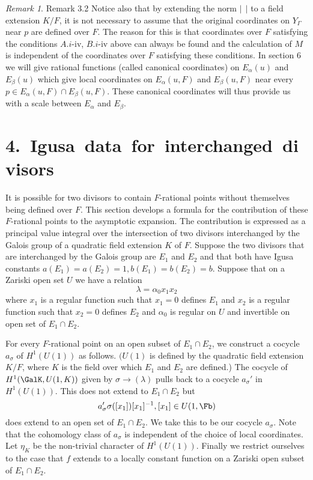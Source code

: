 \documentclass{memo-l}
\theoremstyle{definition}
\theoremstyle{remark}
\newtheorem{remark}[theorem]{Remark}
\numberwithin{section}{chapter}
\numberwithin{equation}{chapter}
\begin{document}
\begin{remark}{Remark 3.2} Notice also that by extending the norm $\vert\
\ 
\vert$ to a field extension $K/F$, it is not necessary to assume that the
original coordinates on $Y_{{\Gamma}}$ near $p$ are defined over $F$.  The
reason for this is that coordinates over $F$ satisfying the conditions
$A.i$-iv, $B.i$-iv above can always be found and the calculation of $M$ is
independent of the coordinates over $F$ satisfying these conditions.  In
section $6$ we will give rational functions (called canonical coordinates)
on $E_{{\alpha}}(u)$ and $E_{{\beta}}(u)$ which give local coordinates on
$E_{{\alpha}}(u,F)$ and $E_{\beta}(u,F)$ near every $p \in
E_{{\alpha}}(u,F) \cap E_{{\beta}}(u,F)$.  These canonical coordinates
will thus provide us with a scale between $E_{{\alpha}}$ and $E_{{\beta}}$.
\end{remark}

\section{4.\ Igusa\ data\ for\ interchanged\ divisors}

   It is possible for two divisors to contain $F$-rational points without
themselves being defined over $F$.  This section develops a formula for the
contribution of these $F$-rational points to the asymptotic expansion.  The
contribution is expressed as a principal value integral over the
intersection of two divisors interchanged by the Galois group of a
quadratic field extension $K$ of $F$.  Suppose the two divisors that are
interchanged by the Galois group are $E_{1}$ and $E_{2}$ and that both have
Igusa constants $a(E_{1}) = a(E_{2}) = 1, b(E_{1}) = b(E_{2}) = b$.
Suppose that on a Zariski open set $U$ we have a relation
$$
{\lambda} = {\alpha}_{0}x_{1}x_{2}
$$
where $x_{1}$ is a regular function such that $x_{1} = 0$ defines $E_{1}$
and $x_{2}$ is a regular function such that $x_{2} = 0$ defines $E_{2}$ and
${\alpha}_{0}$ is regular on $U$ and invertible on open set of $E_{1}
\cap E_{2}$.
 

   For every $F$-rational point on an open subset of $E_{1} \cap E_{2}$, we
construct a cocycle $a_{{\sigma}}$ of $H^{1}(U(1))$ as follows.  $(U(1)$ is
defined by the quadratic field extension $K/F$, where $K$ is the field over
which $E_{1}$ and $E_{2}$ are defined.) The cocycle of
$H^{1}(\GalK,U(1,K))$ given by ${\sigma} {\to} ({\lambda})$ pulls back
to a cocycle $a_{{\sigma}}'$ in $H^{1}(U(1))$.  This does not extend to
$E_{1} \cap E_{2}$ but
$$
a_{{\sigma}}'{\sigma}([x_{1}])[x_{1}]^{-1}, [x_{1}] \in U(1,\Fb)
$$
does extend to an open set of $E_{1} \cap E_{2}$.  We take this to be our
cocycle $a_{{\sigma}}$.  Note that the cohomology class of $a_{{\sigma}}$
is independent of the choice of local coordinates.  Let ${\eta}_{K}$ be the
non-trivial character of $H^{1}(U(1))$.  Finally we restrict ourselves to
the case that $f$ extends to a locally constant function on a Zariski open
subset of $E_{1} \cap E_{2}$.
\end{document}
